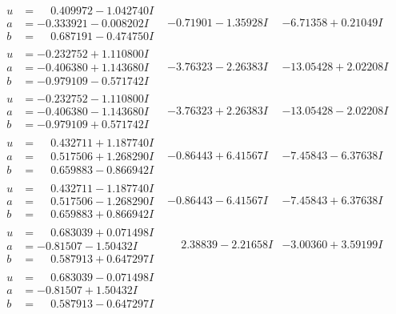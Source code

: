 \documentclass[1p]{elsarticle_modified}
\theoremstyle{definition}
\begin{document}
$$\begin{array}{c|c|c}
\begin{aligned}
u &= \phantom{-}0.409972 - 1.042740 I \\
a &= -0.333921 - 0.008202 I \\
b &= \phantom{-}0.687191 - 0.474750 I\end{aligned}
 & -0.71901 - 1.35928 I & -6.71358 + 0.21049 I \\ \hline\begin{aligned}
u &= -0.232752 + 1.110800 I \\
a &= -0.406380 + 1.143680 I \\
b &= -0.979109 - 0.571742 I\end{aligned}
 & -3.76323 - 2.26383 I & -13.05428 + 2.02208 I \\ \hline\begin{aligned}
u &= -0.232752 - 1.110800 I \\
a &= -0.406380 - 1.143680 I \\
b &= -0.979109 + 0.571742 I\end{aligned}
 & -3.76323 + 2.26383 I & -13.05428 - 2.02208 I \\ \hline\begin{aligned}
u &= \phantom{-}0.432711 + 1.187740 I \\
a &= \phantom{-}0.517506 + 1.268290 I \\
b &= \phantom{-}0.659883 - 0.866942 I\end{aligned}
 & -0.86443 + 6.41567 I & -7.45843 - 6.37638 I \\ \hline\begin{aligned}
u &= \phantom{-}0.432711 - 1.187740 I \\
a &= \phantom{-}0.517506 - 1.268290 I \\
b &= \phantom{-}0.659883 + 0.866942 I\end{aligned}
 & -0.86443 - 6.41567 I & -7.45843 + 6.37638 I \\ \hline\begin{aligned}
u &= \phantom{-}0.683039 + 0.071498 I \\
a &= -0.81507 - 1.50432 I \\
b &= \phantom{-}0.587913 + 0.647297 I\end{aligned}
 & \phantom{-}2.38839 - 2.21658 I & -3.00360 + 3.59199 I \\ \hline\begin{aligned}
u &= \phantom{-}0.683039 - 0.071498 I \\
a &= -0.81507 + 1.50432 I \\
b &= \phantom{-}0.587913 - 0.647297 I\end{aligned}

\end{array}$$
\end{document}

